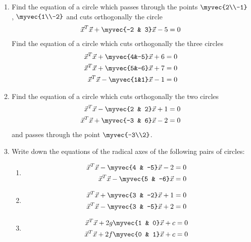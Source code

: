 \renewcommand{\theequation}{\theenumi}
\begin{enumerate}[label=\arabic*.,ref=\thesubsection.\theenumi]
\item Find the equation of a circle which passes through the points $\myvec{2\\-1}$, $\myvec{1\\-2}$ and cuts orthogonally the circle
\begin{align}
\vec{x}^T\vec{x}+\myvec{-2 & 3}\vec{x}-5 = 0
\end{align}
Find the equation of a circle which cuts orthogonally the three circles
\begin{align}
    \vec{x}^T\vec{x} + \myvec{4&-5}\vec{x} + 6 = 0\label{4/4/2/circle1}\\
    \vec{x}^T\vec{x} + \myvec{5&-6}\vec{x} + 7 = 0\label{4/4/2/circle2}\\
    \vec{x}^T\vec{x} - \myvec{1&1}\vec{x} - 1 = 0\label{4/4/2/circle3}
\end{align}
\solution

\item Find the equation of a circle which cuts orthogonally the two circles
\begin{align}
\vec{x}^T\vec{x}-\myvec{2 & 2}\vec{x}+1 = 0
\\
\vec{x}^T\vec{x}+\myvec{-3 & 6}\vec{x}-2 = 0
\end{align}
and passes through the point $\myvec{-3\\2}$.
\item Write down the equations of the radical axes of the following pairs of circles:
\begin{enumerate}
\item
%
\begin{align}
\vec{x}^T\vec{x}-\myvec{4 & -5}\vec{x}-2 = 0
\\
\vec{x}^T\vec{x}-\myvec{5 & -6}\vec{x} = 0
\end{align}
%
\item
\begin{align}
%
\vec{x}^T\vec{x}+\myvec{3 & -2}\vec{x}+1 = 0
\\
\vec{x}^T\vec{x}-\myvec{3 & -5}\vec{x}+2 = 0
\end{align}
%
\item
\begin{align}
%
\vec{x}^T\vec{x}+2g\myvec{1 & 0}\vec{x}+c = 0
\\
\vec{x}^T\vec{x}+2f\myvec{0 & 1}\vec{x}+c = 0
\end{align}
%
\end{enumerate}

\end{enumerate}
